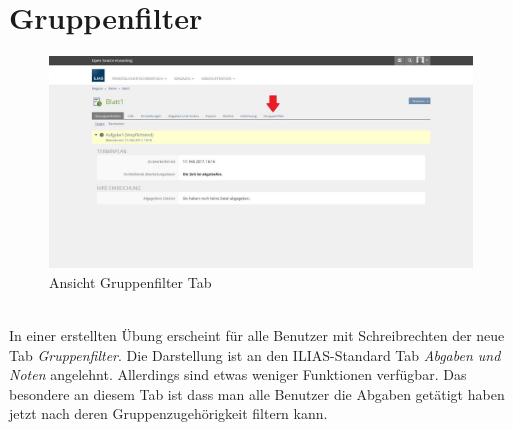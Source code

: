 \chapter{Gruppenfilter}\label{gruppenfilter}
\begin{figure}[h!]
	\centering
	\includegraphics[width=1\textwidth]{img/excerciseGruppenfilter.jpg}
	\caption{Ansicht Gruppenfilter Tab}
\end{figure}

~\\In einer erstellten Übung erscheint für alle Benutzer mit Schreibrechten der neue Tab \textit{Gruppenfilter}. Die Darstellung ist an den ILIAS-Standard Tab \textit{Abgaben und Noten} angelehnt. Allerdings sind etwas weniger Funktionen verfügbar. Das besondere an diesem Tab ist dass man alle Benutzer die Abgaben getätigt haben jetzt nach deren Gruppenzugehörigkeit filtern kann.
\newpage
